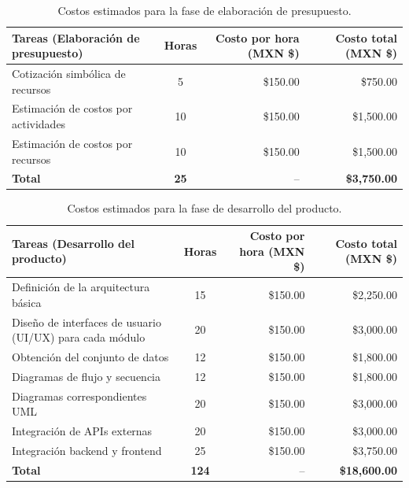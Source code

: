 \begin{table}[H]
	\centering
	\renewcommand{\arraystretch}{1.6}
	\setlength{\tabcolsep}{10pt}
	\Huge
	\begin{adjustbox}{max width=\textwidth}
		\begin{tabular}{|p{9.5cm}|c|r|r|}
			\hline
			\textbf{Tareas (Elaboración de presupuesto)} & \textbf{Horas} & \textbf{Costo por hora (MXN \$)} & \textbf{Costo total (MXN \$)} \\ \hline
			Cotización simbólica de recursos & 5 & \$150.00 & \$750.00 \\ \hline
			Estimación de costos por actividades & 10 & \$150.00 & \$1,500.00 \\ \hline
			Estimación de costos por recursos & 10 & \$150.00 & \$1,500.00 \\ \hline
			\textbf{Total} & \textbf{25} & -- & \textbf{\$3,750.00} \\ \hline
		\end{tabular}
	\end{adjustbox}
	\caption{Costos estimados para la fase de elaboración de presupuesto.}
	\label{tab:costos_presupuesto_nuevo}
\end{table}

\begin{table}[H]
	\centering
	\renewcommand{\arraystretch}{1.6}
	\setlength{\tabcolsep}{10pt}
	\Huge
	\begin{adjustbox}{max width=\textwidth}
		\begin{tabular}{|p{9.5cm}|c|r|r|}
			\hline
			\textbf{Tareas (Desarrollo del producto)} & \textbf{Horas} & \textbf{Costo por hora (MXN \$)} & \textbf{Costo total (MXN \$)} \\ \hline
			Definición de la arquitectura básica & 15 & \$150.00 & \$2,250.00 \\ \hline
			Diseño de interfaces de usuario (UI/UX) para cada módulo & 20 & \$150.00 & \$3,000.00 \\ \hline
			Obtención del conjunto de datos & 12 & \$150.00 & \$1,800.00 \\ \hline
			Diagramas de flujo y secuencia & 12 & \$150.00 & \$1,800.00 \\ \hline
			Diagramas correspondientes UML & 20 & \$150.00 & \$3,000.00 \\ \hline
			Integración de APIs externas & 20 & \$150.00 & \$3,000.00 \\ \hline
			Integración backend y frontend & 25 & \$150.00 & \$3,750.00 \\ \hline
			\textbf{Total} & \textbf{124} & -- & \textbf{\$18,600.00} \\ \hline
		\end{tabular}
	\end{adjustbox}
	\caption{Costos estimados para la fase de desarrollo del producto.}
	\label{tab:costos_desarrollo_nuevo}
\end{table}



